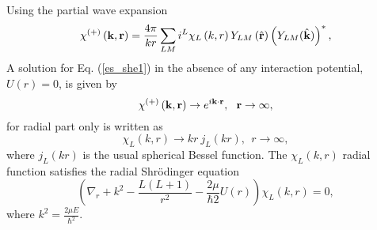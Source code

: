 \documentclass[
11pt, %
english, %
onehalfspacing, %
headsepline, %
]{MastersDoctoralThesis} %
\begin{document}
Using the partial wave expansion 
\begin{equation}
\chi^{(+)} \left( {\bf k}, {\bf r} \right) = 
\frac{4 \pi}{kr} \sum_{LM} i^{L} \chi_L \left( k,r \right) 
Y_{LM}\left( \hat{{\bf r}}\right) \left( Y_{LM}( \hat{{\bf k}})\right)^{*},
\end{equation}
A solution for Eq. (\ref{es_she1}) in the absence of any interaction potential, $U \left( r \right) = 0$, is given by 
\begin{equation}
\chi^{(+)} \left( {\bf k}, {\bf r} \right) \rightarrow
e^{i {\bf k} \cdot {\bf r}}, ~~ {\bf r} \rightarrow \infty, 
\end{equation}
for radial part only is written as
\begin{equation}
\chi_L \left( k,r \right)  \rightarrow kr~j_L \left(kr \right),
~~ r \rightarrow \infty,
\end{equation}
where $j_L \left(kr \right)$ is the usual spherical Bessel function. The $\chi_L \left( k,r \right)$ radial function satisfies the radial Shr\"{o}dinger equation
\begin{equation}
\left( \nabla_r + k^2 - \frac{L(L+1)}{r^2} - \frac{2 \mu}{\hbar2} U \left( r \right)\right) \chi_L \left( k,r \right) =0,
\label{es_she_radial}
\end{equation}
where $k^2 = \frac{2\mu E}{\hbar^2}$.
\end{document}
